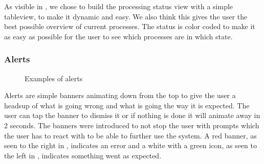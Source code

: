 As visible in , we chose to build the processing status view with a simple tableview, to make it dynamic and easy. We also think this gives the user the best possible overview of current processes. The status is color coded to make it as easy as possible for the user to see which processes are in which state. 

\subsubsection{Alerts}
\begin{figure}[ht]
\caption{Examples of alerts}
\label{fig:ios_alerts}
\end{figure}
\FloatBarrier

Alerts are simple banners animating down from the top to give the user a headsup of what is going wrong and what is going the way it is expected. The user can tap the banner to dismiss it or if nothing is done it will animate away in 2 seconds. The banners were introduced to not stop the user with prompts which the user has to react with to be able to further use the system. A red banner, as seen to the right in , indicates an error and a white with a green icon, as seen to the left in , indicates something went as expected. 
